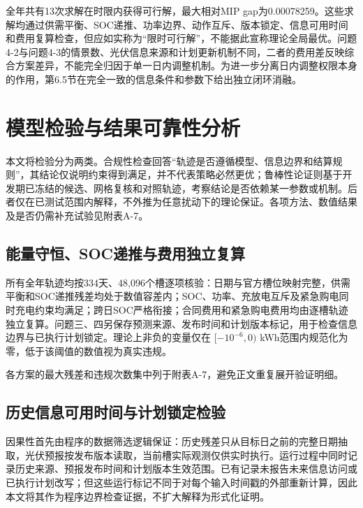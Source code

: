 \documentclass[zihao=-4,a4paper,UTF8,fontset=none]{ctexart}
\begin{document}
全年共有13次求解在时限内获得可行解，最大相对MIP gap为0.00078259。这些求解均通过供需平衡、SOC递推、功率边界、动作互斥、版本锁定、信息可用时间和费用复算检查，但应如实称为``限时可行解''，不能据此宣称理论全局最优。问题4-2与问题4-3的情景数、光伏信息来源和计划更新机制不同，二者的费用差反映综合方案差异，不能完全归因于单一日内调整机制。为进一步分离日内调整权限本身的作用，第6.5节在完全一致的信息条件和参数下给出独立闭环消融。

\section{模型检验与结果可靠性分析}\label{ux6a21ux578bux68c0ux9a8cux4e0eux7ed3ux679cux53efux9760ux6027ux5206ux6790}

本文将检验分为两类。合规性检查回答``轨迹是否遵循模型、信息边界和结算规则''，其结论仅说明约束得到满足，并不代表策略必然更优；鲁棒性论证则基于开发期已冻结的候选、网格复核和对照轨迹，考察结论是否依赖某一参数或机制。后者仅在已测试范围内解释，不外推为任意扰动下的理论保证。各项方法、数值结果及是否仍需补充试验见附表A-7。

\subsection{能量守恒、SOC递推与费用独立复算}\label{ux80fdux91cfux5b88ux6052socux9012ux63a8ux4e0eux8d39ux7528ux72ecux7acbux590dux7b97}

所有全年轨迹均按334天、48,096个槽逐项核验：日期与官方槽位映射完整，供需平衡和SOC递推残差均处于数值容差内；SOC、功率、充放电互斥及紧急购电同时充电约束均满足；跨日SOC严格衔接；合同费用和紧急购电费用均由逐槽轨迹独立复算。问题三、四另保存预测来源、发布时间和计划版本标记，用于检查信息边界与已执行计划锁定。理论上非负的变量仅在 \([-10^{-6},0)\) kWh范围内规范化为零，低于该阈值的数值视为真实违规。

各方案的最大残差和违规次数集中列于附表A-7，避免正文重复展开验证明细。

\subsection{历史信息可用时间与计划锁定检验}\label{ux5386ux53f2ux4fe1ux606fux53efux7528ux65f6ux95f4ux4e0eux8ba1ux5212ux9501ux5b9aux68c0ux9a8c}

因果性首先由程序的数据筛选逻辑保证：历史残差只从目标日之前的完整日期抽取，光伏预报按发布版本读取，当前槽实际观测仅供实时执行。运行过程中同时记录历史来源、预报发布时间和计划版本生效范围。已有记录未报告未来信息访问或已执行计划改写；但这些运行标记不同于对每个输入时间戳的外部重新计算，因此本文将其作为程序边界检查证据，不扩大解释为形式化证明。
\end{document}

